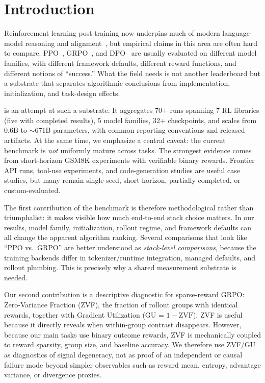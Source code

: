 \section{Introduction}
\label{sec:intro}

Reinforcement learning post-training now underpins much of modern
language-model reasoning and alignment~\citep{ouyang2022training,%
guo2025deepseekr1nature}, but empirical claims in this area are often hard to
compare. PPO~\citep{schulman2017proximal}, GRPO~\citep{shao2024deepseekmath},
and DPO~\citep{rafailov2024direct} are usually evaluated on different model
families, with different framework defaults, different reward functions, and
different notions of ``success.'' What the field needs is not another
leaderboard but a substrate that separates algorithmic conclusions from
implementation, initialization, and task-design effects.

\ours{} is an attempt at such a substrate. It aggregates 70+ runs spanning 7 RL
libraries (five with completed results), 5 model families, 32+ checkpoints, and
scales from 0.6B to $\sim$671B parameters, with common reporting conventions and
released artifacts.
At the same time, we emphasize a central caveat: the current benchmark is
\emph{not} uniformly mature across tasks. The strongest evidence comes from
short-horizon GSM8K experiments with verifiable binary rewards. Frontier API
runs, tool-use experiments, and code-generation studies are useful case
studies, but many remain single-seed, short-horizon, partially completed, or
custom-evaluated.

The first contribution of the benchmark is therefore methodological rather than
triumphalist: it makes visible how much end-to-end stack choice matters. In our
results, model family, initialization, rollout regime, and framework defaults
can all change the apparent algorithm ranking. Several comparisons that look
like ``PPO vs.\ GRPO'' are better understood as \emph{stack-level comparisons},
because the training backends differ in tokenizer/runtime integration, managed
defaults, and rollout plumbing. This is precisely why a shared measurement
substrate is needed.

Our second contribution is a descriptive diagnostic for sparse-reward GRPO:
Zero-Variance Fraction (ZVF), the fraction of rollout groups with identical
rewards, together with Gradient Utilization (GU = $1-\mathrm{ZVF}$). ZVF is
useful because it directly reveals when within-group contrast disappears.
However, because our main tasks use binary outcome rewards, ZVF is mechanically
coupled to reward sparsity, group size, and baseline accuracy. We therefore use
ZVF/GU as diagnostics of signal degeneracy, not as proof of an independent or
causal failure mode beyond simpler observables such as reward mean, entropy,
advantage variance, or divergence proxies.

